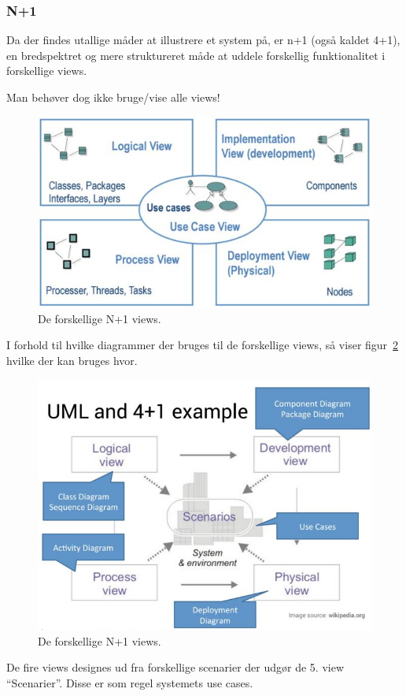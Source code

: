 \subsubsection{N+1}
Da der findes utallige måder at illustrere et system på, er n+1 (også kaldet 4+1), en bredspektret og mere struktureret måde at uddele forskellig funktionalitet i forskellige views.

Man behøver dog ikke bruge/vise alle views!

\begin{figure}[H]
	\centering
	\includegraphics[width=0.8\linewidth]{figs/nplusoneview}
	\caption{De forskellige N+1 views.}
	\label{fig:nplusoneview}
\end{figure}

I forhold til hvilke diagrammer der bruges til de forskellige views, så viser figur~\ref{fig:nplusonedia} hvilke der kan bruges hvor.

\begin{figure}[H]
	\centering
	\includegraphics[width=0.8\linewidth]{figs/nplusonedia}
	\caption{De forskellige N+1 views.}
	\label{fig:nplusonedia}
\end{figure}

De fire views designes ud fra forskellige scenarier der udgør de 5. view “Scenarier”. Disse er som regel systemets use cases.\\


